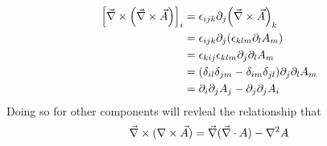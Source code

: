 \documentclass{article}
\begin{document}
\begin{align*}
  \qty[\vec{\nabla } \times \qty(\vec{\nabla}\times  \vec{A} )]_i &= \epsilon_{ijk}\partial_j\qty(\vec{\nabla }\times \vec{A}  )_k \\ 
                                                                  &= \epsilon_{ijk}\partial_j\qty(\epsilon_{klm}\partial_l A_m) \\ 
                                                                  &=\epsilon_{kij} \epsilon_{klm}\partial_j \partial_l A_m \\ 
                                                                  &= \qty(\delta_{il} \delta_{jm} - \delta_{im}\delta_{jl}) \partial_j \partial_l A_m \\ 
                                                                  &= \partial_i \partial_j A_j -\partial_j \partial_j A_i 
 \end{align*}
 Doing so for other components will revleal the relationship that 
 \begin{equation*}
 \vec{\nabla} \times  (\nabla \times \vec{A}) = \vec{\nabla } (\vec{\nabla }\cdot A ) - \laplacian A
 \end{equation*}
 
\end{document}
